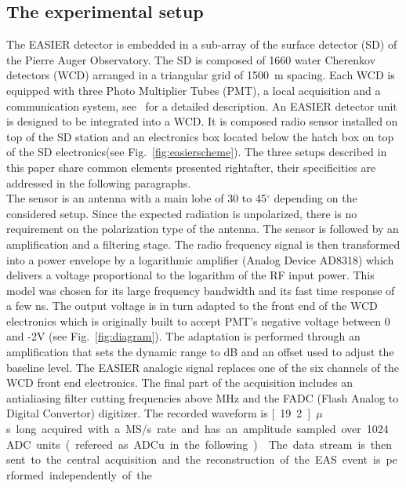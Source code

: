 \subsection{The experimental setup}  
The EASIER detector is embedded in a sub-array of the surface detector
(SD) of the Pierre Auger Observatory. The SD is composed of 1660 water
Cherenkov  detectors (WCD)  arranged in  a triangular  grid  of 1500~m
spacing. Each WCD is equipped with three Photo Multiplier Tubes (PMT),
a     local     acquisition     and    a     communication     system,
see~\cite{augerdetector}  for  a   detailed  description.   An  EASIER
detector unit is designed to be  integrated into a WCD. It is composed
radio sensor installed on top of the SD station and an electronics box
located  below  the  hatch  box  on  top  of  the  SD  electronics(see
Fig.~\ref{fig:easierscheme}). The three setups described in this paper
share  common elements presented  rightafter, their  specificities are
addressed in the following paragraphs.\\ The sensor is an antenna with
a main  lobe of  30 to 45$^\circ$  depending on the  considered setup.
Since the  expected radiation is unpolarized, there  is no requirement
on the polarization type of the antenna.  The sensor is followed by an
amplification and  a filtering stage.   The radio frequency  signal is
then  transformed into  a power  envelope by  a  logarithmic amplifier
(Analog Device  AD8318) which delivers  a voltage proportional  to the
logarithm of the RF input power.   This model was chosen for its large
frequency bandwidth  and its  fast time response  of a  few \unit[tens
  of]{ns}.  The output voltage is in  turn adapted to the front end of
the WCD electronics which is originally built to accept PMT's negative
voltage   between  0  and   -2V  (see   Fig.~\ref{fig:diagram}).   The
adaptation is performed through an amplification that sets the dynamic
range  to \unit[20]{dB}  and an  offset  used to  adjust the  baseline
level.  The EASIER analogic signal replaces one of the six channels of
the  WCD front  end electronics.   The final  part of  the acquisition
includes   an   antialiasing    filter   cutting   frequencies   above
\unit[20]{MHz}  and  the  FADC  (Flash Analog  to  Digital  Convertor)
digitizer.  The recorded waveform is \unit[19.2]{$\mu$s} long acquired
with a \unit[40]{MS/s} rate and has an amplitude sampled over 1024 ADC
units (refereed  as ADCu in  the following)~\cite{augerdetector}.  The
data  stream  is  then  sent   to  the  central  acquisition  and  the
reconstruction  of the  EAS event  is performed  independently  of the
